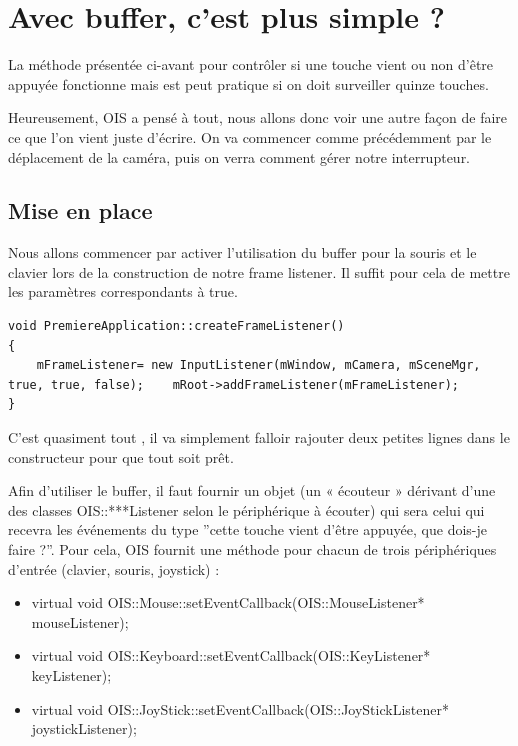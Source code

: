 \documentclass[10pt,a4paper]{report}
\begin{document}
\section{Avec buffer, c'est plus simple ?}

La m\'ethode pr\'esent\'ee ci-avant pour contrôler si une touche vient ou non d'\^etre appuy\'ee fonctionne mais est peut pratique si on doit surveiller quinze touches.

Heureusement, OIS a pens\'e \`a tout, nous allons donc voir une autre fa\c{c}on de faire ce que l'on vient juste d'\'ecrire. On va commencer comme pr\'ec\'edemment par le d\'eplacement de la cam\'era, puis on verra comment g\'erer notre interrupteur.


\subsection{Mise en place}


Nous allons commencer par activer l'utilisation du buffer pour la souris et le clavier lors de la construction de notre frame listener. Il suffit pour cela de mettre les param\`etres correspondants \`a true.


\begin{lstlisting}[caption={Activation du buffer pour la souris et le clavier}]
void PremiereApplication::createFrameListener()
{
    mFrameListener= new InputListener(mWindow, mCamera, mSceneMgr, true, true, false);    mRoot->addFrameListener(mFrameListener);
}
\end{lstlisting}


C'est quasiment tout , il va simplement falloir rajouter deux petites lignes dans le constructeur pour que tout soit pr\^et.

Afin d'utiliser le buffer, il faut fournir un objet (un « \'ecouteur » d\'erivant d'une des classes OIS::***Listener selon le p\'eriph\'erique \`a \'ecouter) qui sera celui qui recevra les \'ev\'enements du type ''cette touche vient d'\^etre appuy\'ee, que dois-je faire ?''. Pour cela, OIS fournit une m\'ethode pour chacun de trois p\'eriph\'eriques d'entr\'ee (clavier, souris, joystick) :


\begin{itemize}
\item  virtual void OIS::Mouse::setEventCallback(OIS::MouseListener* mouseListener);
\item  virtual void OIS::Keyboard::setEventCallback(OIS::KeyListener* keyListener);
\item  virtual void OIS::JoyStick::setEventCallback(OIS::JoyStickListener* joystickListener);
\end{itemize}
\end{document}
